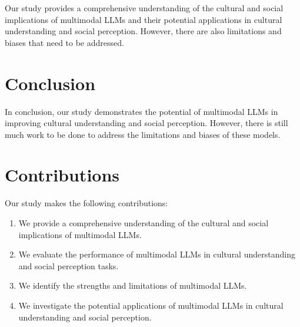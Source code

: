 \documentclass{article}
\begin{document}
Our study provides a comprehensive understanding of the cultural and social implications of multimodal LLMs and their potential applications in cultural understanding and social perception. However, there are also limitations and biases that need to be addressed.

\section{Conclusion}

In conclusion, our study demonstrates the potential of multimodal LLMs in improving cultural understanding and social perception. However, there is still much work to be done to address the limitations and biases of these models.

\section{Contributions}

Our study makes the following contributions:

\begin{enumerate}
\item We provide a comprehensive understanding of the cultural and social implications of multimodal LLMs.
\item We evaluate the performance of multimodal LLMs in cultural understanding and social perception tasks.
\item We identify the strengths and limitations of multimodal LLMs.
\item We investigate the potential applications of multimodal LLMs in cultural understanding and social perception.
\end{enumerate}
\end{document}
